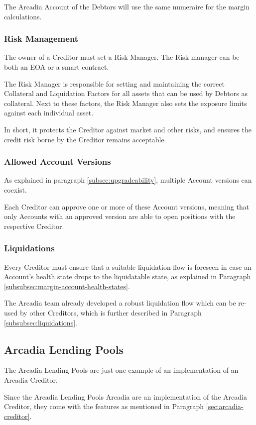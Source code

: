 \documentclass[sigconf,nonacm]{acmart}
\begin{document}
The Arcadia Account of the Debtors will use the same numeraire for the margin calculations.

\subsubsection{Risk Management}
The owner of a Creditor must set a Risk Manager.
The Risk manager can be both an EOA or a smart contract.

The Risk Manager is responsible for setting and maintaining the correct Collateral and Liquidation Factors for all assets that can be used by Debtors as collateral.
Next to these factors, the Risk Manager also sets the exposure limits against each individual asset. 

In short, it protects the Creditor against market and other risks, and ensures the credit risk borne by the Creditor remains acceptable.

\subsubsection{Allowed Account Versions}
As explained in paragraph \ref{subsec:upgradeability}, multiple Account versions can coexist.

Each Creditor can approve one or more of these Account versions,
meaning that only Accounts with an approved version are able to open positions with the respective Creditor.

\subsubsection{Liquidations}
Every Creditor must ensure that a suitable liquidation flow is foreseen in case an Account's health state drops to the liquidatable state,
as explained in Paragraph \ref{subsubsec:margin-account-health-states}.

The Arcadia team already developed a robust liquidation flow which can be re-used by other Creditors,
which is further described in Paragraph \ref{subsubsec:liquidations}.

\subsection{Arcadia Lending Pools}
The Arcadia Lending Pools are just one example of an implementation of an Arcadia Creditor.

Since the Arcadia Lending Pools Arcadia are an implementation of the Arcadia Creditor,
they come with the features as mentioned in Paragraph \ref{sec:arcadia-creditor}.
\end{document}
